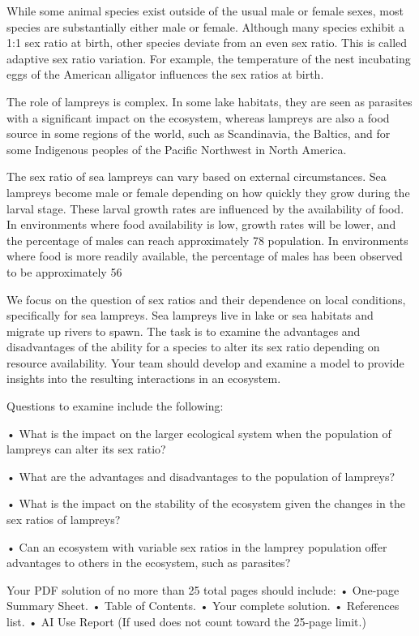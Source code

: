 \documentclass[12pt]{article}
\begin{document}
While some animal species exist outside of the usual male or female sexes, most species are
substantially either male or female. Although many species exhibit a 1:1 sex ratio at birth, other
species deviate from an even sex ratio. This is called adaptive sex ratio variation. For example,
the temperature of the nest incubating eggs of the American alligator influences the sex ratios at
birth.

The role of lampreys is complex. In some lake habitats, they are seen as parasites with a
significant impact on the ecosystem, whereas lampreys are also a food source in some regions of
the world, such as Scandinavia, the Baltics, and for some Indigenous peoples of the Pacific
Northwest in North America.

The sex ratio of sea lampreys can vary based on external circumstances. Sea lampreys become
male or female depending on how quickly they grow during the larval stage. These larval growth
rates are influenced by the availability of food. In environments where food availability is low,
growth rates will be lower, and the percentage of males can reach approximately 78%
population. In environments where food is more readily available, the percentage of males has
been observed to be approximately 56%

We focus on the question of sex ratios and their dependence on local conditions, specifically for
sea lampreys. Sea lampreys live in lake or sea habitats and migrate up rivers to spawn. The task
is to examine the advantages and disadvantages of the ability for a species to alter its sex ratio
depending on resource availability. Your team should develop and examine a model to provide
insights into the resulting interactions in an ecosystem.

Questions to examine include the following:

• What is the impact on the larger ecological system when the population of lampreys can
alter its sex ratio?

• What are the advantages and disadvantages to the population of lampreys?

• What is the impact on the stability of the ecosystem given the changes in the sex ratios of
lampreys?

• Can an ecosystem with variable sex ratios in the lamprey population offer advantages to
others in the ecosystem, such as parasites?

Your PDF solution of no more than 25 total pages should include:
• One-page Summary Sheet.
• Table of Contents.
• Your complete solution.
• References list.
• AI Use Report (If used does not count toward the 25-page limit.)
\end{document}
